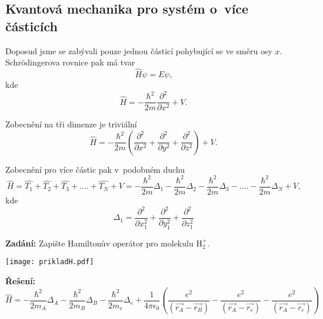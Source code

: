 \subsection{Kvantová mechanika pro systém o~více částicích}

Doposud jsme se zabývali pouze jednou částicí pohybující se ve směru osy $x$. Schr\"odingerova rovnice pak má tvar
\begin{equation}
\hat{H}\psi = E\psi \mbox{,}
\label{rov:Vicecastic1}
\end{equation}
kde
\begin{equation}
\hat{H} = -\frac{\hbar^2}{2m}\frac{\partial^2}{\partial x^2} + V{.}
\label{rov:Vicecastic2}
\end{equation}

\noindent Zobecnění na tři dimenze je triviální
\begin{equation}
\hat{H} = -\frac{\hbar^2}{2m}\left( \frac{\partial^2}{\partial x^2} + \frac{\partial^2}{\partial y^2} + \frac{\partial^2}{\partial z^2} \right ) + V \mbox{.}
\label{rov:Vicecastic3}
\end{equation}

\noindent Zobecnění pro více částic pak v~podobném duchu
\begin{equation}
\hat{H} = \hat{T_1} + \hat{T_2} + \hat{T_3} + .... + \hat{T_N} + V = -\frac{\hbar^2}{2m}\Delta_1 - \frac{\hbar^2}{2m}\Delta_2 - \frac{\hbar^2}{2m}\Delta_3 - .... - \frac{\hbar^2}{2m}\Delta_N + V \mbox{,}
\label{rov:Vicecastic4}
\end{equation}
kde
\begin{equation}
\Delta_1 = \frac{\partial^2}{\partial x_1^2} + \frac{\partial^2}{\partial y_1^2} + \frac{\partial^2}{\partial z_1^2}
\label{rov:Vicecastic5}
\end{equation}

\begin{priklad}
\textbf{Zadání:}  Zapište Hamiltonův operátor pro molekulu H$_2^{+}$.

\begin{center}
\texttt{[image: prikladH.pdf]}

\end{center}

\textbf{Řešení:}
\begin{equation}
\hat{H} = -\frac{\hbar ^2}{2m_A} \Delta _A - \frac{\hbar^2}{2m_B}\Delta _B -\frac{\hbar^2}{2m_e}\Delta _e + \frac{1}{4\pi \epsilon _0} \left( \frac{e^2}{(\vec{r_A} - \vec{r_B})} - \frac{e^2}{(\vec{r_A} - \vec{r_e})}  - \frac{e^2}{(\vec{r_A} - \vec{r_e})} \right)
\nonumber
\label{rov:Vicecastic6}
\end{equation}

\end{priklad}





